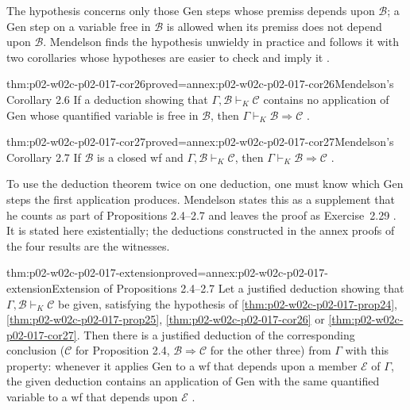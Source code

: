 The hypothesis concerns only those Gen steps whose premiss depends upon
\(\mathscr B\); a Gen step on a variable free in \(\mathscr B\) is allowed
when its premiss does not depend upon \(\mathscr B\).  Mendelson finds the
hypothesis unwieldy in practice and follows it with two corollaries whose
hypotheses are easier to check and imply it
\cite[\S 2.4, pp.~74--75]{Mendelson1997}.

\begin{hbcorollary}{thm:p02-w02c-p02-017-cor26}{proved=annex:p02-w02c-p02-017-cor26}{Mendelson's Corollary 2.6}
If a deduction showing that \(\Gamma,\mathscr B\vdash_K\mathscr C\) contains
no application of Gen whose quantified variable is free in \(\mathscr B\),
then \(\Gamma\vdash_K\mathscr B\Rightarrow\mathscr C\)
\cite[\S 2.4, p.~75]{Mendelson1997}.
\end{hbcorollary}

\begin{hbcorollary}{thm:p02-w02c-p02-017-cor27}{proved=annex:p02-w02c-p02-017-cor27}{Mendelson's Corollary 2.7}
If \(\mathscr B\) is a closed wf and \(\Gamma,\mathscr B\vdash_K\mathscr C\),
then \(\Gamma\vdash_K\mathscr B\Rightarrow\mathscr C\)
\cite[\S 2.4, p.~75]{Mendelson1997}.
\end{hbcorollary}

To use the deduction theorem twice on one deduction, one must know which Gen
steps the first application produces.  Mendelson states this as a
supplement that he counts as part of Propositions 2.4--2.7 and leaves the
proof as Exercise~2.29 \cite[\S 2.4, pp.~75--76]{Mendelson1997}.  It is
stated here existentially; the deductions constructed in the annex proofs of
the four results are the witnesses.

\begin{hbtheorem}{thm:p02-w02c-p02-017-extension}{proved=annex:p02-w02c-p02-017-extension}{Extension of Propositions 2.4--2.7}
Let a justified deduction showing that \(\Gamma,\mathscr B\vdash_K\mathscr C\)
be given, satisfying the hypothesis of
\cref{thm:p02-w02c-p02-017-prop24}, \cref{thm:p02-w02c-p02-017-prop25},
\cref{thm:p02-w02c-p02-017-cor26} or \cref{thm:p02-w02c-p02-017-cor27}.
Then there is a justified deduction of the corresponding conclusion
(\(\mathscr C\) for Proposition 2.4, \(\mathscr B\Rightarrow\mathscr C\) for
the other three) from \(\Gamma\) with this property: whenever it applies Gen
to a wf that depends upon a member \(\mathscr E\) of \(\Gamma\), the given
deduction contains an application of Gen with the same quantified variable to
a wf that depends upon \(\mathscr E\) \cite[\S 2.4, p.~75]{Mendelson1997}.
\end{hbtheorem}

